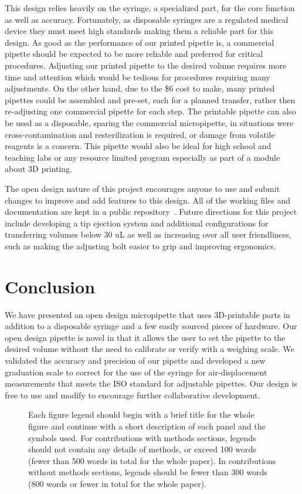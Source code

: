 \documentclass{nature}
\begin{document}
This design relies heavily on the syringe, a specialized part, for the core function as well as accuracy.
Fortunately, as disposable syringes are a regulated medical device they must meet high standards making them a reliable part for this design.
As good as the performance of our printed pipette is, a commercial pipette should be expected to be more reliable and preferred for critical procedures. 
Adjusting our printed pipette to the desired volume requires more time and attention which would be tedious for procedures requiring many adjustments.
On the other hand, due to the \$6 cost to make, many printed pipettes could be assembled and pre-set, each for a planned transfer, rather then re-adjusting one commercial pipette for each step.
The printable pipette can also be used as a disposable, sparing the commercial micropipette, in situations were cross-contamination and resterilization is required, or damage from volatile reagents is a concern.
This pipette would also be ideal for high school and teaching labs or any resource limited program especially as part of a module about 3D printing.

The open design nature of this project encourages anyone to use and submit changes to improve and add features to this design.
All of the working files and documentation are kept in a public repository~\cite{BMLmicropipette}.
Future directions for this project include developing a tip ejection system and additional configurations for transferring volumes below 30 uL as well as increasing over all user friendliness, such as making the adjusting bolt easier to grip and improving ergonomics.


\section*{Conclusion}
We have presented an open design micropipette that uses 3D-printable parts in addition to a disposable syringe and a few easily sourced pieces of hardware.
Our open design pipette is novel in that it allows the user to set the pipette to the desired volume without the need to calibrate or verify with a weighing scale. 
We validated the accuracy and precision of our pipette and developed a new graduation scale to correct for the use of the syringe for air-displacement measurements that meets the ISO standard for adjustable pipettes.
Our design is free to use and modify to encourage further collaborative development.

\begin{figure}
\caption{Each figure legend should begin with a brief title for
the whole figure and continue with a short description of each
panel and the symbols used. For contributions with methods
sections, legends should not contain any details of methods, or
exceed 100 words (fewer than 500 words in total for the whole
paper). In contributions without methods sections, legends should
be fewer than 300 words (800 words or fewer in total for the whole
paper).}
\end{figure}
\end{document}
